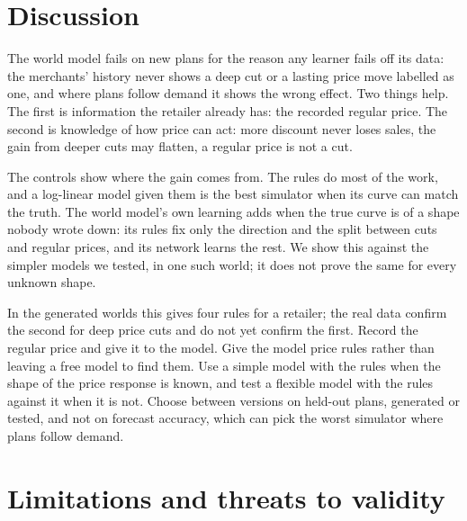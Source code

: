 \section{Discussion}\label{sec:discussion}

The world model fails on new plans for the reason any learner fails off its data: the merchants' history never
shows a deep cut or a lasting price move labelled as one, and where plans follow demand it shows the wrong effect. Two things help. The first is information the retailer
already has: the recorded regular price. The second is knowledge of how price can act: more discount never loses
sales, the gain from deeper cuts may flatten, a regular price is not a cut.

The controls show where the gain comes from. The rules do most of the work, and a log-linear model given them is
the best simulator when its curve can match the truth. The world model's own learning adds when the true curve is
of a shape nobody wrote down: its rules fix only the direction and the split between cuts and regular prices, and
its network learns the rest. We show this against the simpler models we tested, in one such world; it does not
prove the same for every unknown shape.

In the generated worlds this gives four rules for a retailer; the real data confirm the second for deep price cuts
and do not yet confirm the first. Record the regular price and give it to the model. Give the model price rules
rather than leaving a free model to find them. Use a simple model with the rules when the shape of the price response
is known, and test a flexible model with the rules against it when it is not. Choose between versions on held-out plans, generated or
tested, and not on forecast accuracy, which can pick the worst simulator where plans follow demand.

\section{Limitations and threats to validity}\label{sec:limits}


